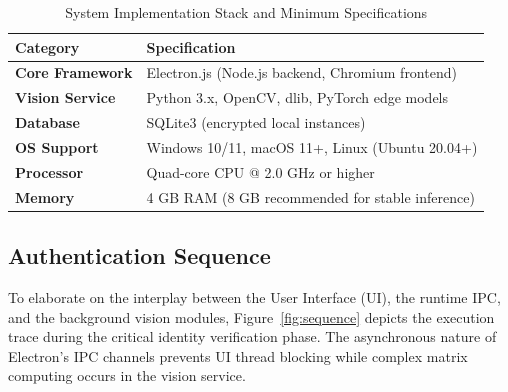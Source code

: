 \documentclass[conference]{IEEEtran}
\begin{document}
\begin{table}[h]
\caption{System Implementation Stack and Minimum Specifications}
\label{tab:requirements}
\centering
\begin{tabular}{p{2.3cm}p{5.5cm}}
\toprule
\textbf{Category} & \textbf{Specification} \\
\midrule
\textbf{Core Framework} & Electron.js (Node.js backend, Chromium frontend) \\
\textbf{Vision Service} & Python 3.x, OpenCV, dlib, PyTorch edge models \\
\textbf{Database} & SQLite3 (encrypted local instances) \\
\textbf{OS Support} & Windows 10/11, macOS 11+, Linux (Ubuntu 20.04+) \\
\textbf{Processor} & Quad-core CPU @ 2.0 GHz or higher \\
\textbf{Memory} & 4 GB RAM (8 GB recommended for stable inference) \\
\bottomrule
\end{tabular}
\end{table}

\subsection{Authentication Sequence}
To elaborate on the interplay between the User Interface (UI), the runtime IPC, and the background vision modules, Figure~\ref{fig:sequence} depicts the execution trace during the critical identity verification phase. The asynchronous nature of Electron's IPC channels prevents UI thread blocking while complex matrix computing occurs in the vision service.
\end{document}
